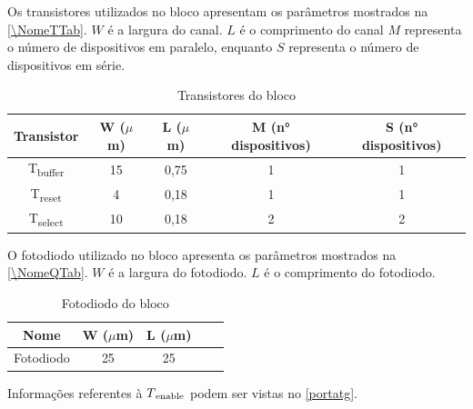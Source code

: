 Os transistores utilizados no bloco apresentam os par\^ametros mostrados na \autoref{\NomeTTab}. $W$ é a largura do canal. $L$ é o comprimento do canal $M$ representa o número de dispositivos em paralelo, enquanto $S$ representa o número de dispositivos em série.

\begin{table}[!h]
\caption{Transistores do bloco \NomeBloco}
\label{\NomeTTab}
\centering
\begin{tabular}{ccccc}
\toprule
Transistor & W ($\mu$m)  & L ($\mu$m)           & M (n° dispositivos) & S (n° dispositivos)\\
\midrule \midrule
T\textsubscript{buffer} & 15 & 0,75 & 1 & 1\\
\midrule
T\textsubscript{reset} & 4 & 0,18 & 1 & 1\\
\midrule
T\textsubscript{select} & 10 & 0,18 & 2 & 2\\
\bottomrule
\end{tabular}
\end{table}

O fotodiodo utilizado no bloco apresenta os par\^ametros mostrados na \autoref{\NomeQTab}. $W$ é a largura do fotodiodo. $L$ é o comprimento do fotodiodo.

\begin{table}[!h]
\caption{Fotodiodo do bloco \NomeBloco}
\label{\NomeQTab}
\centering
\begin{tabular}{ccccc}
\toprule
Nome & W ($\mu$m)  & L ($\mu$m)\\
\midrule \midrule
Fotodiodo & 25 & 25\\
\bottomrule
\end{tabular}
\end{table}

Informações referentes à $T\textsubscript{enable}$ podem ser vistas no \autoref{portatg}.